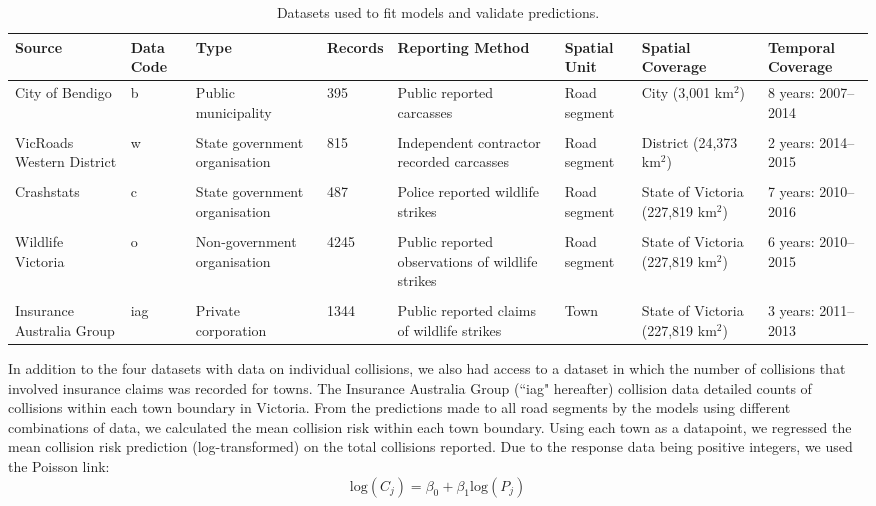 \begin{table}[!t]
\caption[Datasets used to fit collision models and validate predictions]{Datasets used to fit models and validate predictions.}
\centering
\begin{tabularx}{0.9\textwidth}{@{}YYYlYYYY@{}} \toprule
Source						&Data Code	&Type	&Records	&Reporting Method	&Spatial Unit	&Spatial Coverage	&Temporal Coverage \\ \midrule

City of Bendigo		&b		&Public municipality			&395		&Public reported carcasses			&Road segment		&City (3,001 km$^2$)	&8 years: 2007--2014 \\

&&&&&&\\

VicRoads Western District	&w		&State government organisation	&815		&Independent contractor recorded  carcasses			&Road segment		&District (24,373 km$^2$)	&2 years: 2014--2015 \\

&&&&&&\\

Crashstats		&c			&State government organisation	&487		&Police reported wildlife strikes			&Road segment		&State of Victoria (227,819 km$^2$)	&7 years: 2010--2016 \\

&&&&&&\\

Wildlife Victoria	&o		&Non-government organisation	&4245		&Public reported observations of wildlife strikes			&Road segment		&State of Victoria (227,819 km$^2$)	&6 years: 2010--2015 \\

&&&&&&\\

Insurance Australia Group	&iag	&Private corporation			&1344		&Public reported claims of wildlife strikes			&Town		&State of Victoria (227,819 km$^2$)	&3 years: 2011--2013 \\

\bottomrule
\end{tabularx}
\label{val_data}
\end{table}


In addition to the four datasets with data on individual collisions, we also had access to a dataset in which the number of collisions that involved insurance claims was recorded for towns. The Insurance Australia Group (``iag" hereafter) collision data detailed counts of collisions within each town boundary in Victoria. From the predictions made to all road segments by the models using different combinations of data, we calculated the mean collision risk within each town boundary. Using each town as a datapoint, we regressed the mean collision risk prediction (log-transformed) on the total collisions reported. Due to the response data being positive integers, we used the Poisson link:
\begin{equation} \label{eq:62}
\text{log}(C_j) = \beta_0 + \beta_1\text{log}(P_j)
\end{equation}


